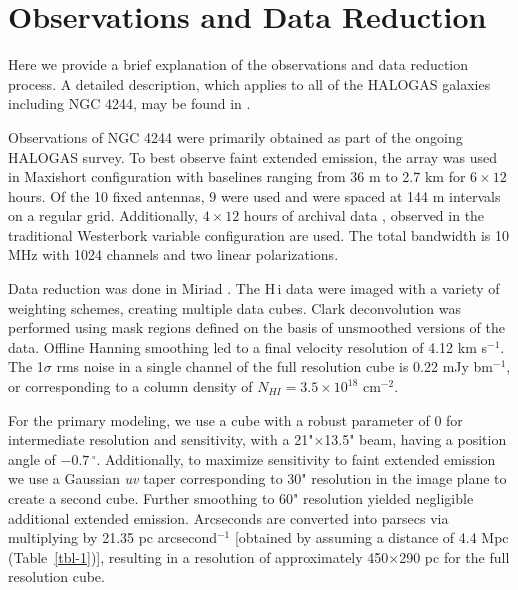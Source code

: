 \documentclass{emulateapj}
\begin{document}
\section{Observations and Data Reduction} \label{Section2}

\par
     Here we provide a brief explanation of the observations and data reduction process.  A detailed description, which applies to all of the HALOGAS galaxies including NGC 4244, may be found in \citet{2011A&A...526A.118H}.      

\par
     Observations of NGC 4244 were primarily obtained as part of the ongoing HALOGAS survey. To best observe faint extended emission, the array was used in Maxishort configuration with baselines ranging from 36 m to 2.7 km for $6\times12$ hours.  Of the 10 fixed antennas, 9 were used and were spaced at 144 m intervals on a regular grid.  Additionally, $4\times12$ hours of archival data \citep{2005A&A...432..475D}, observed in the traditional Westerbork variable configuration are used. The total bandwidth is 10 MHz with 1024 channels and two linear polarizations.  

\par
  Data reduction was done in Miriad \citep{1995ASPC...77..433S}. The {\sc H\,i} data were imaged with a variety of weighting schemes, creating multiple data cubes.  Clark deconvolution \citep{1980A&A....89..377C} was performed using mask regions defined on the basis of unsmoothed versions of the data.  Offline Hanning smoothing led to a final velocity resolution of 4.12 km s$^{-1}$.  The 1$\sigma$ rms noise in a single channel of the full resolution cube is 0.22 mJy bm$^{-1}$, or corresponding to a column density of  $N_{HI}=3.5\times10^{18}$ cm$^{-2}$.

\par
    For the primary modeling, we use a cube with a robust parameter of 0 for intermediate resolution and sensitivity, with a 21"$\times$13.5" beam, having a position angle of $-0.7\,^{\circ}$. Additionally, to maximize sensitivity to faint extended emission we use a Gaussian {\it uv} taper corresponding to 30" resolution in the image plane to create a second cube.  Further smoothing to 60" resolution yielded negligible additional extended emission.  Arcseconds are converted into parsecs via multiplying by 21.35 pc arcsecond$^{-1}$ [obtained by assuming a distance of 4.4 Mpc (Table~\ref{tbl-1})], resulting in a resolution of approximately 450$\times$290 pc for the full resolution cube.  
\end{document}
